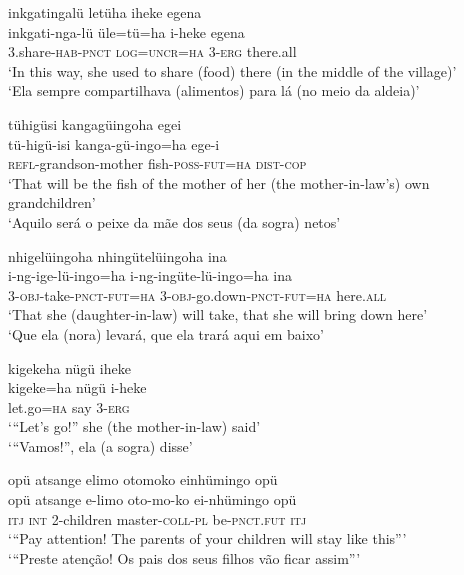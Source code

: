 \documentclass[output=paper,
modfonts,nonflat
]{langsci/langscibook}
\begin{document}
\ea inkgatingalü letüha iheke egena \\[.3em]
\gll  inkgati-nga-lü		üle=tü=ha		i-heke	egena \\
3.share\textsc{-hab-pnct}	\textsc{log=uncr=ha} 	\textsc{3-erg}	there.all \\
\glt ‘In this way, she used to share (food) there (in the middle of the village)’ \\
‘Ela sempre compartilhava (alimentos) para lá (no meio da aldeia)’  \\
\z

 
\ea tühigüsi kangagüingoha egei \\[.3em]
\gll tü-higü-isi kanga-gü-ingo=ha ege-i \\
\textsc{refl}-grandson-mother fish\textsc{-poss-fut=ha} \textsc{dist-cop} \\
\glt ‘That will be the fish of the mother of her (the mother-in-law's) own grandchildren’ \\
‘Aquilo será o peixe da mãe dos seus (da sogra) netos’ \\
\z

\ea nhigelüingoha nhingütelüingoha ina \\[.3em]
\gll i-ng-ige-lü-ingo=ha		i-ng-ingüte-lü-ingo=ha 		ina \\
3-\textsc{obj}-take-\textsc{pnct-fut=ha} 	3-\textsc{obj}-go.down-\textsc{pnct-fut=ha} 	here\textsc{.all} \\
\glt ‘That she (daughter-in-law) will take, that she will bring down here’ \\
‘Que ela (nora) levará, que ela trará aqui em baixo’ \\
\z

\ea kigekeha nügü iheke \\[.3em]
kigeke=ha	nügü	i-heke \\
let.go\textsc{=ha} 	say 	3-\textsc{erg} \\
\glt ‘“Let’s go!” she (the mother-in-law) said’ \\
‘“Vamos!”, ela (a sogra) disse’ \\
\z

\newpage 
\ea opü atsange elimo otomoko einhümingo opü \\[.3em]
\gll opü	atsange		e-limo		oto-mo-ko	ei-nhümingo		opü \\
\textsc{itj} 	\textsc{int} 		2-children 	master-\textsc{coll-pl} be-\textsc{pnct.fut} \textsc{itj} \\
\glt ‘“Pay attention! The parents of your children will stay like this”’ \\
‘“Preste atenção! Os pais dos seus filhos vão ficar assim”’ \\
\z
\end{document}
